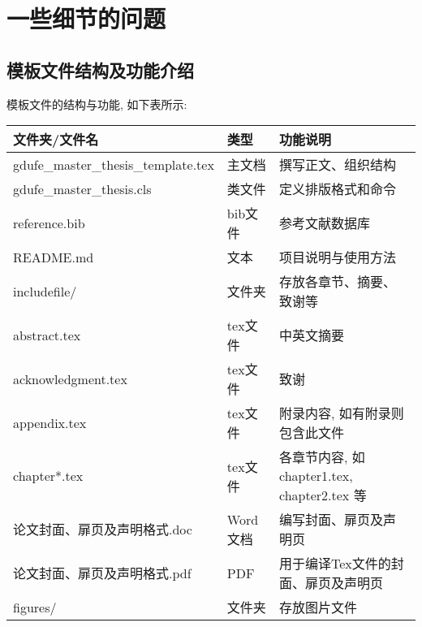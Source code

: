 \chapter{一些细节的问题 \the\baselineskip}
\the\baselineskip
\section{模板文件结构及功能介绍 \the\baselineskip}

模板文件的结构与功能, 如下表所示: \the\baselineskip
\begin{table}[ht]\centering
    \begin{tabular}{lll}
        \toprule
        文件夹/文件名                             & 类型     & 功能说明                                  \\
        \midrule
        gdufe\_master\_thesis\_template.tex & 主文档    & 撰写正文、组织结构                             \\
        gdufe\_master\_thesis.cls           & 类文件    & 定义排版格式和命令                             \\
        reference.bib                       & bib文件  & 参考文献数据库                               \\
        README.md                           & 文本     & 项目说明与使用方法                             \\
        includefile/                        & 文件夹    & 存放各章节、摘要、致谢等                          \\
        \quad abstract.tex                  & tex文件  & 中英文摘要                                 \\
        \quad acknowledgment.tex            & tex文件  & 致谢                                    \\
        \quad appendix.tex                  & tex文件  & 附录内容, 如有附录则包含此文件                      \\
        \quad chapter*.tex                  & tex文件  & 各章节内容, 如 chapter1.tex, chapter2.tex 等 \\
        \quad 论文封面、扉页及声明格式.doc              & Word文档 & 编写封面、扉页及声明页                           \\
        \quad 论文封面、扉页及声明格式.pdf              & PDF    & 用于编译Tex文件的封面、扉页及声明页                   \\
        figures/                            & 文件夹    & 存放图片文件                                \\

\end{tabular}
\end{table}
